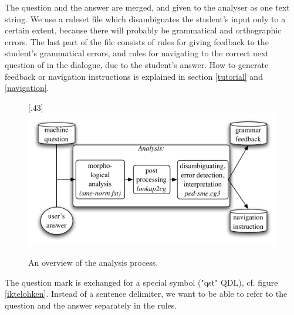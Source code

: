 \documentclass[11pt]{article}
\begin{document}
The question and the answer are merged, and given to the analyser as one text string. We use a ruleset file which disambiguates the student's input only to a certain extent, because there will probably be grammatical and orthographic errors. The last part of the file consists of rules for giving feedback to the student's grammatical errors, and rules for navigating to the correct next question of in the dialogue, due to the student's answer. How to generate feedback or navigation instructions is explained in section \ref{tutorial} and \ref{navigation}.


\begin{figure}[htbp]
\begin{center}
\scalebox{.48}[.43]{\includegraphics{presentation/img/qa2.pdf}}
\caption{An overview of the analysis process.}
\label{qasystem}
\end{center}
\end{figure}

The question mark is exchanged for a special symbol ("qst" QDL), cf. figure \ref{iktelohken}. Instead of a sentence delimiter, we want to be able to refer to the question and the answer separately in the rules.
\end{document}

